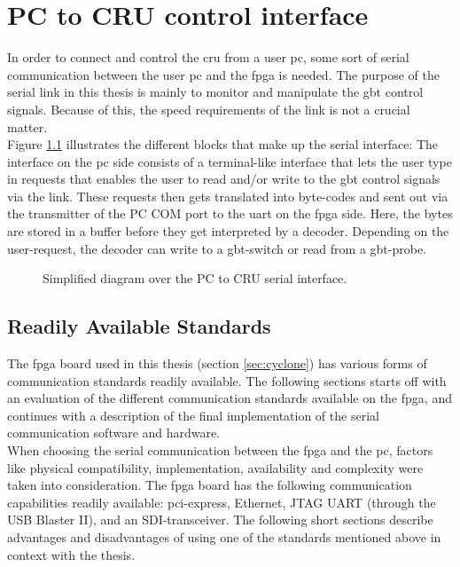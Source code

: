 \documentclass[main.tex]{subfiles}
\begin{document}
\chapter{PC to CRU control interface} \label{chap:sercom}

In order to connect and control the \gls{cru} from a user \acrshort{pc}, some sort of serial communication between the user \acrshort{pc} and the \gls{fpga} is needed. The purpose of the serial link in this thesis is mainly to monitor and manipulate the \gls{gbt} control signals. Because of this, the speed requirements of the link is not a crucial matter. \\
Figure \ref{fig:sergui} illustrates the different blocks that make up the serial interface: The interface on the \acrshort{pc} side consists of a terminal-like interface that lets the user type in requests that enables the user to read and/or write to the \gls{gbt} control signals via the link. These requests then gets translated into byte-codes and sent out via the transmitter of the PC COM port to the \gls{uart} on the \gls{fpga} side. Here, the bytes are stored in a buffer before they get interpreted by a decoder. Depending on the user-request, the decoder can write to a \gls{gbt}-switch or read from a \gls{gbt}-probe.

\begin{figure} %

\caption{Simplified diagram over the PC to CRU serial interface.}
\label{fig:sergui}
\end{figure}

\section{Readily Available Standards}
The \gls{fpga} board used in this thesis (section \ref{sec:cyclone}) has various forms of communication standards readily available. The following sections starts off with an evaluation of the different communication standards available on the \gls{fpga}, and continues with a description of the final implementation of the serial communication software and hardware.\\

When choosing the serial communication between the \gls{fpga} and the \acrshort{pc}, factors like physical compatibility, implementation, availability and complexity were taken into consideration. The \gls{fpga} board has the following communication capabilities readily available: \gls{pci}-express, Ethernet, JTAG UART (through the USB Blaster II), and an SDI-transceiver. The following short sections describe advantages and disadvantages of using one of the standards mentioned above in context with the thesis.
\end{document}
